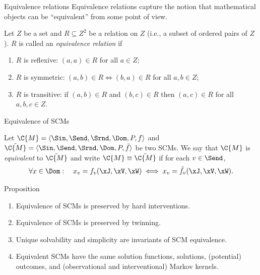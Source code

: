 \begin{frame}{Equivalence relations}
Equivalence relations capture the notion that mathematical objects can be ``equivalent'' from some point of view.
\begin{definition}
  Let $Z$ be a set and $R \subseteq Z^2$ be a relation on $Z$ (i.e., a subset of ordered pairs of $Z$). $R$ is called an \emph{equivalence relation} if 
  \begin{enumerate}
    \item $R$ is reflexive: $(a,a) \in R$ for all $a \in Z$;
    \item $R$ is symmetric: $(a,b) \in R \iff (b,a) \in R$ for all $a,b \in Z$;
    \item $R$ is transitive: if $(a,b) \in R$ and $(b,c) \in R$ then $(a,c) \in R$ for all $a,b,c\in Z$.
  \end{enumerate}
\end{definition}
\end{frame}

\begin{frame}{Equivalence of SCMs}
\begin{definition}
  Let $\C{M} = \langle \Sin, \Send, \Srnd, \Dom, P, f \rangle$ and
  $\tilde{\C{M}} = \langle \Sin, \Send, \Srnd, \Dom, P, \tilde{f} \rangle$ be two SCMs.
  We say that
  $\C{M}$ is \emph{equivalent} to $\tilde{\C{M}}$ and write $\C{M} \equiv \tilde{\C{M}}$ if for each $v \in \Send$,
  $$\forall x \in \Dom: \quad x_v = f_v(\xJ,\xV,\xW) \iff x_v = \tilde{f}_v(\xJ,\xV,\xW).$$
\end{definition}
\begin{block}{Proposition}
\begin{enumerate}
  \item Equivalence of SCMs is preserved by hard interventions.
  \item Equivalence of SCMs is preserved by twinning.
  \item Unique solvability and simplicity are invariants of SCM equivalence.
  \item Equivalent SCMs have the same solution functions, solutions, (potential) outcomes, and (observational and interventional) Markov kernels.
\end{enumerate}
\end{block}
\end{frame}

